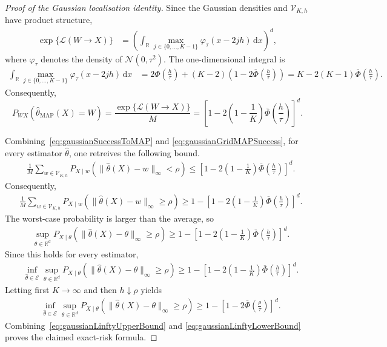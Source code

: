 \documentclass[11pt]{article}
\theoremstyle{definition}
\theoremstyle{remark}
\newcommand{\1}{\boldsymbol{1}}
\newcommand{\ml}[2]{\mathcal{L}(#1\!\to\!#2)}
\begin{document}
\begin{proof}[Proof of the Gaussian localisation identity]
Since the Gaussian densities and $\mathcal V_{K,h}$ have product
structure,
\begin{align}
\exp\{\ml{W}{X}\}
&=
\left(
\int_{\mathbb R}
\max_{j\in\{0,\ldots,K-1\}}
\varphi_\tau(x-2jh)\,
\mathrm dx
\right)^d,
\end{align}
where $\varphi_\tau$ denotes the density of
$\mathcal N(0,\tau^2)$. The one-dimensional integral is
\begin{align}
\int_{\mathbb R}
\max_{j\in\{0,\ldots,K-1\}}
\varphi_\tau(x-2jh)\,
\mathrm dx
&=
2\Phi\left(\frac{h}{\tau}\right)
+
(K-2)
\left(
1-2\overline\Phi\left(\frac{h}{\tau}\right)
\right)=
K-
2(K-1)\overline\Phi\left(\frac{h}{\tau}\right).
\end{align}
Consequently,
\begin{equation}
P_{WX}
\left(
\widehat\theta_{\mathrm{MAP}}(X)=W
\right)
=
\frac{\exp\{\ml{W}{X}\}}{M}
=
\left[
1-
2\left(1-\frac{1}{K}\right)
\overline\Phi\left(\frac{h}{\tau}\right)
\right]^d.
\label{eq:gaussianGridMAPSuccess}
\end{equation}

Combining~\eqref{eq:gaussianSuccessToMAP} and
\eqref{eq:gaussianGridMAPSuccess}, for every estimator
$\widehat\theta$, one retreives the following bound.
\begin{align}
&\frac1M
\sum_{w\in\mathcal V_{K,h}}
P_{X\mid w}
\left(
\|\widehat\theta(X)-w\|_\infty<\rho
\right)\leq
\left[
1-
2\left(1-\frac1K\right)
\overline\Phi\left(\frac{h}{\tau}\right)
\right]^d.
\end{align}
Consequently, 
\begin{align}
&\frac1M
\sum_{w\in\mathcal V_{K,h}}
P_{X\mid w}
\left(
\|\widehat\theta(X)-w\|_\infty\geq\rho
\right)\geq
1-
\left[
1-
2\left(1-\frac1K\right)
\overline\Phi\left(\frac{h}{\tau}\right)
\right]^d.
\end{align}
The worst-case probability is larger than the average, so
\begin{align}
&\sup_{\theta\in\mathbb R^d}
P_{X\mid\theta}
\left(
\|\widehat\theta(X)-\theta\|_\infty\geq\rho
\right)\geq
1-
\left[
1-
2\left(1-\frac1K\right)
\overline\Phi\left(\frac{h}{\tau}\right)
\right]^d.
\end{align}
Since this holds for every estimator,
\begin{align}
&\inf_{\widehat\theta\in\mathcal E}
\sup_{\theta\in\mathbb R^d}
P_{X\mid\theta}
\left(
\|\widehat\theta(X)-\theta\|_\infty\geq\rho
\right)\geq
1-
\left[
1-
2\left(1-\frac1K\right)
\overline\Phi\left(\frac{h}{\tau}\right)
\right]^d.
\end{align}
Letting first $K\to\infty$ and then $h\downarrow\rho$ yields
\begin{align}
&\inf_{\widehat\theta\in\mathcal E}
\sup_{\theta\in\mathbb R^d}
P_{X\mid\theta}
\left(
\|\widehat\theta(X)-\theta\|_\infty\geq\rho
\right)\geq
1-
\left[
1-2\overline\Phi\left(\frac{\rho}{\tau}\right)
\right]^d.
\label{eq:gaussianLinftyLowerBound}
\end{align}
Combining~\eqref{eq:gaussianLinftyUpperBound} and
\eqref{eq:gaussianLinftyLowerBound} proves the claimed exact-risk formula.
\end{proof}\fi
\iffalse
\end{document}
